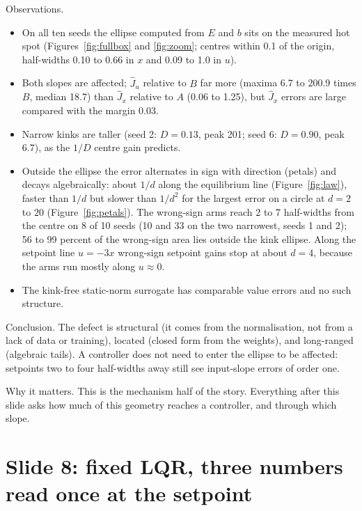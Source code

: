 \documentclass[11pt]{article}
\begin{document}
Observations.
\begin{itemize}
\item On all ten seeds the ellipse computed from $E$ and $b$ sits on the measured hot spot (Figures~\ref{fig:fullbox} and \ref{fig:zoom}; centres within 0.1 of the origin, half-widths 0.10 to 0.66 in $x$ and 0.09 to 1.0 in $u$).
\item Both slopes are affected; $\hat J_u$ relative to $B$ far more (maxima 6.7 to 200.9 times $B$, median 18.7) than $\hat J_x$ relative to $A$ (0.06 to 1.25), but $\hat J_x$ errors are large compared with the margin 0.03.
\item Narrow kinks are taller (seed 2: $D=0.13$, peak 201; seed 6: $D=0.90$, peak 6.7), as the $1/D$ centre gain predicts.
\item Outside the ellipse the error alternates in sign with direction (petals) and decays algebraically: about $1/d$ along the equilibrium line (Figure~\ref{fig:law}), faster than $1/d$ but slower than $1/d^2$ for the largest error on a circle at $d=2$ to $20$ (Figure~\ref{fig:petals}). The wrong-sign arms reach 2 to 7 half-widths from the centre on 8 of 10 seeds (10 and 33 on the two narrowest, seeds 1 and 2); 56 to 99 percent of the wrong-sign area lies outside the kink ellipse. Along the setpoint line $u=-3x$ wrong-sign setpoint gains stop at about $d=4$, because the arms run mostly along $u\approx0$.
\item The kink-free static-norm surrogate has comparable value errors and no such structure.
\end{itemize}
Conclusion. The defect is structural (it comes from the normalisation, not from a lack of data or training), located (closed form from the weights), and long-ranged (algebraic tails). A controller does not need to enter the ellipse to be affected: setpoints two to four half-widths away still see input-slope errors of order one.

Why it matters. This is the mechanism half of the story. Everything after this slide asks how much of this geometry reaches a controller, and through which slope.

\section{Slide 8: fixed LQR, three numbers read once at the setpoint}\label{sec:s4}
\end{document}
